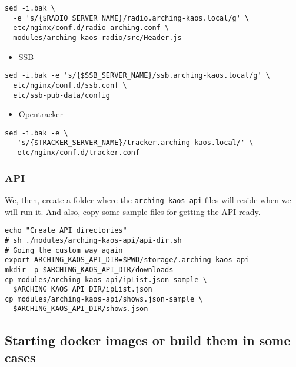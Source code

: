 \documentclass[12pt]{report}
\begin{document}
\begin{verbatim}
sed -i.bak \
  -e 's/{$RADIO_SERVER_NAME}/radio.arching-kaos.local/g' \
  etc/nginx/conf.d/radio-arching.conf \
  modules/arching-kaos-radio/src/Header.js
\end{verbatim}

\begin{itemize}

\item
  SSB
\end{itemize}

\begin{verbatim}
sed -i.bak -e 's/{$SSB_SERVER_NAME}/ssb.arching-kaos.local/g' \
  etc/nginx/conf.d/ssb.conf \
  etc/ssb-pub-data/config
\end{verbatim}

\begin{itemize}

\item
  Opentracker
\end{itemize}

\begin{verbatim}
sed -i.bak -e \
   's/{$TRACKER_SERVER_NAME}/tracker.arching-kaos.local/' \
   etc/nginx/conf.d/tracker.conf
\end{verbatim}


\subsubsection{API}\label{api}

We, then, create a folder where the \texttt{arching-kaos-api} files will
reside when we will run it. And also, copy some sample files for getting
the API ready.

\begin{verbatim}
echo "Create API directories"
# sh ./modules/arching-kaos-api/api-dir.sh 
# Going the custom way again
export ARCHING_KAOS_API_DIR=$PWD/storage/.arching-kaos-api
mkdir -p $ARCHING_KAOS_API_DIR/downloads
cp modules/arching-kaos-api/ipList.json-sample \
  $ARCHING_KAOS_API_DIR/ipList.json
cp modules/arching-kaos-api/shows.json-sample \
  $ARCHING_KAOS_API_DIR/shows.json
\end{verbatim}


\subsection{Starting docker images or build them in some
cases}\label{starting-docker-images-or-build-them-in-some-cases}
\end{document}

